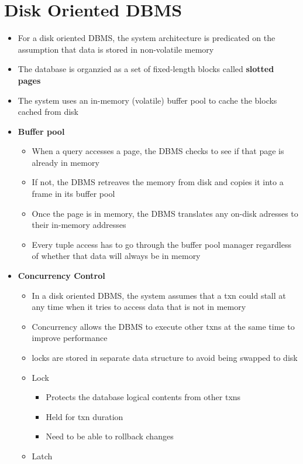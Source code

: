\documentclass[11pt]{article}
\begin{document}
\section{Disk Oriented DBMS}
\begin{itemize}
    \item For a disk oriented DBMS, the system architecture is predicated on the assumption that data is stored in non-volatile memory
    \item The database is organzied as a set of fixed-length blocks called \textbf{slotted pages}
    \item The system uses an in-memory (volatile) buffer pool to cache the blocks cached from disk
    \item \textbf{Buffer pool}
    \begin{itemize}
        \item When a query accesses a page, the DBMS checks to see if that page is already in memory
        \item If not, the DBMS retreaves the memory from disk and copies it into a frame in its buffer pool
        \item Once the page is in memory, the DBMS translates any on-disk adresses to their in-memory addresses
        \item Every tuple access has to go through the buffer pool manager regardless of whether that data will always be in memory
    \end{itemize}
    \item \textbf{Concurrency Control}
    \begin{itemize}
        \item In a disk oriented DBMS, the system assumes that a txn could stall at any time when it tries to access data that is not in memory
        \item Concurrency allows the DBMS to execute other txns at the same time to improve performance
        \item locks are stored in separate data structure to avoid being swapped to disk
        \item Lock
        \begin{itemize}
            \item Protects the database logical contents from other txns
            \item Held for txn duration
            \item Need to be able to rollback changes
        \end{itemize}
        \item Latch

\end{itemize}
\end{itemize}
\end{document}
